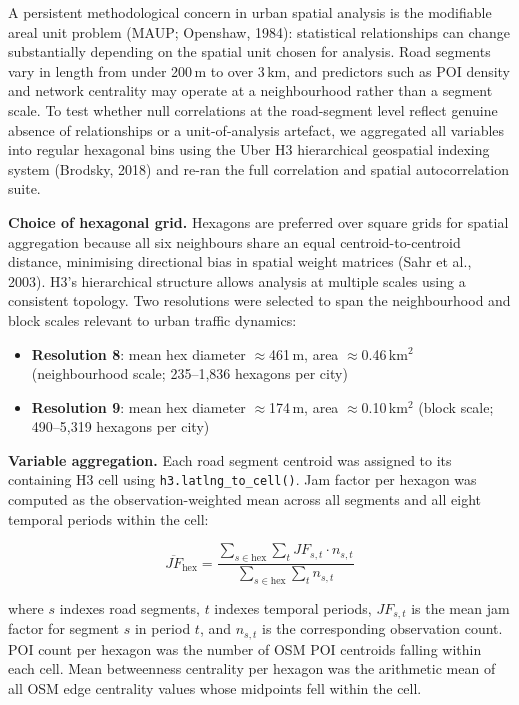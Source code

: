 \documentclass[12pt,a4paper]{article}
\begin{document}
A persistent methodological concern in urban spatial analysis is the modifiable areal unit problem (MAUP; Openshaw, 1984): statistical relationships can change substantially depending on the spatial unit chosen for analysis. Road segments vary in length from under 200\,m to over 3\,km, and predictors such as POI density and network centrality may operate at a neighbourhood rather than a segment scale. To test whether null correlations at the road-segment level reflect genuine absence of relationships or a unit-of-analysis artefact, we aggregated all variables into regular hexagonal bins using the Uber H3 hierarchical geospatial indexing system (Brodsky, 2018) and re-ran the full correlation and spatial autocorrelation suite.

\textbf{Choice of hexagonal grid.} Hexagons are preferred over square grids for spatial aggregation because all six neighbours share an equal centroid-to-centroid distance, minimising directional bias in spatial weight matrices (Sahr et al., 2003). H3's hierarchical structure allows analysis at multiple scales using a consistent topology. Two resolutions were selected to span the neighbourhood and block scales relevant to urban traffic dynamics:

\begin{itemize}
  \item \textbf{Resolution 8}: mean hex diameter $\approx$461\,m, area $\approx$0.46\,km$^2$ (neighbourhood scale; 235--1,836 hexagons per city)
  \item \textbf{Resolution 9}: mean hex diameter $\approx$174\,m, area $\approx$0.10\,km$^2$ (block scale; 490--5,319 hexagons per city)
\end{itemize}

\textbf{Variable aggregation.} Each road segment centroid was assigned to its containing H3 cell using \texttt{h3.latlng\_to\_cell()}. Jam factor per hexagon was computed as the observation-weighted mean across all segments and all eight temporal periods within the cell:

\[\overline{JF}_{\text{hex}} = \frac{\displaystyle\sum_{s \in \text{hex}} \sum_{t} JF_{s,t} \cdot n_{s,t}}{\displaystyle\sum_{s \in \text{hex}} \sum_{t} n_{s,t}}\]

where $s$ indexes road segments, $t$ indexes temporal periods, $JF_{s,t}$ is the mean jam factor for segment $s$ in period $t$, and $n_{s,t}$ is the corresponding observation count. POI count per hexagon was the number of OSM POI centroids falling within each cell. Mean betweenness centrality per hexagon was the arithmetic mean of all OSM edge centrality values whose midpoints fell within the cell.
\end{document}
